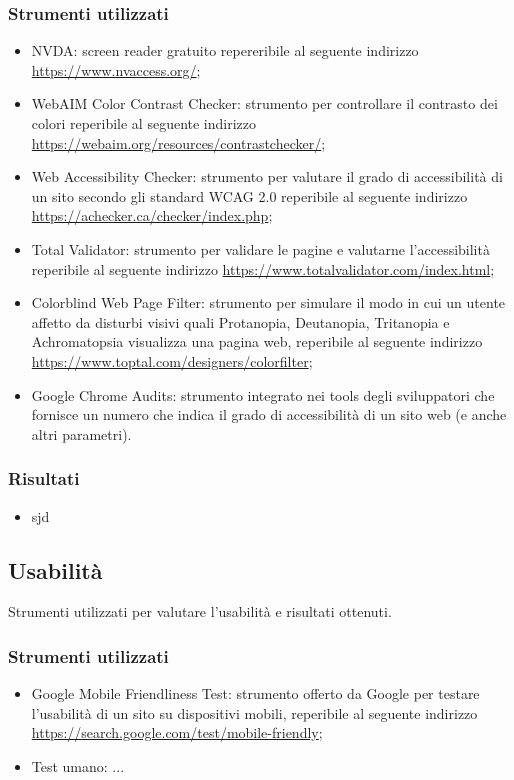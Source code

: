 \documentclass[12pt]{article}
\begin{document}
	\subsubsection{Strumenti utilizzati}
		\begin{itemize}
			\item NVDA: screen reader gratuito repereribile al seguente indirizzo \url{https://www.nvaccess.org/};
			\item WebAIM Color Contrast Checker: strumento per controllare il contrasto dei colori reperibile al seguente indirizzo \url{https://webaim.org/resources/contrastchecker/};
			\item Web Accessibility Checker: strumento per valutare il grado di accessibilità di un sito secondo gli standard WCAG 2.0 reperibile al seguente indirizzo \url{https://achecker.ca/checker/index.php};
			\item Total Validator: strumento per validare le pagine e valutarne l'accessibilità reperibile al seguente indirizzo \url{https://www.totalvalidator.com/index.html};
			\item Colorblind Web Page Filter: strumento per simulare il modo in cui un utente affetto da disturbi visivi quali Protanopia, Deutanopia, Tritanopia e Achromatopsia visualizza una pagina web, reperibile al seguente indirizzo \url{https://www.toptal.com/designers/colorfilter};
			\item Google Chrome Audits: strumento integrato nei tools degli sviluppatori che fornisce un numero che indica il grado di accessibilità di un sito web (e anche altri parametri).
		\end{itemize}
	\subsubsection{Risultati}
		\begin{itemize}
			\item sjd
		\end{itemize}
	
	\subsection{Usabilità}
	Strumenti utilizzati per valutare l'usabilità e risultati ottenuti.
	\subsubsection{Strumenti utilizzati}
		\begin{itemize}
			\item Google Mobile Friendliness Test: strumento offerto da Google per testare l'usabilità di un sito su dispositivi mobili, reperibile al seguente indirizzo \url{https://search.google.com/test/mobile-friendly};
			\item Test umano: ...
		\end{itemize}
\end{document}
